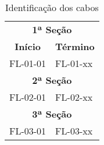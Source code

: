 \begin{table}[]
	\centering
	\label{my-label}
	\begin{tabular}{cl}
	\multicolumn{2}{c}{\textbf{1ª Seção}}                               \\
	\textbf{Início}              & \multicolumn{1}{c}{\textbf{Término}} \\
	\multicolumn{1}{l}{FL-01-01} & FL-01-xx                             \\
	\multicolumn{2}{c}{\textbf{2ª Seção}}                               \\
	\multicolumn{1}{l}{FL-02-01} & FL-02-xx                             \\
	\multicolumn{2}{c}{\textbf{3ª Seção}}                               \\
	\multicolumn{1}{l}{FL-03-01} & FL-03-xx                            
	\end{tabular}
	\caption{Identificação dos cabos}
\end{table}
